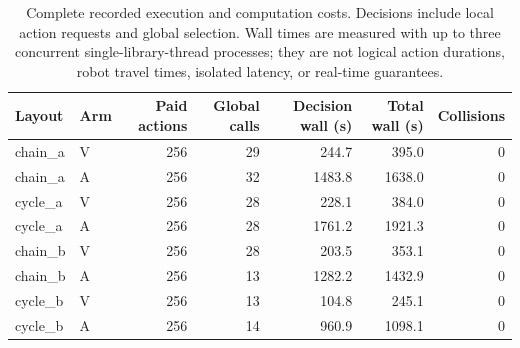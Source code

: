\begin{table}[t]
\centering
\caption{Complete recorded execution and computation costs. Decisions include local action requests and global selection. Wall times are measured with up to three concurrent single-library-thread processes; they are not logical action durations, robot travel times, isolated latency, or real-time guarantees.}
\small\setlength{\tabcolsep}{4pt}
\begin{tabular}{llrrrrr}
\toprule
Layout & Arm & Paid actions & Global calls & Decision wall (s) & Total wall (s) & Collisions \\
\midrule
chain\_a & V & 256 & 29 & 244.7 & 395.0 & 0 \\
chain\_a & A & 256 & 32 & 1483.8 & 1638.0 & 0 \\
cycle\_a & V & 256 & 28 & 228.1 & 384.0 & 0 \\
cycle\_a & A & 256 & 28 & 1761.2 & 1921.3 & 0 \\
chain\_b & V & 256 & 28 & 203.5 & 353.1 & 0 \\
chain\_b & A & 256 & 13 & 1282.2 & 1432.9 & 0 \\
cycle\_b & V & 256 & 13 & 104.8 & 245.1 & 0 \\
cycle\_b & A & 256 & 14 & 960.9 & 1098.1 & 0 \\
\bottomrule
\end{tabular}
\end{table}
